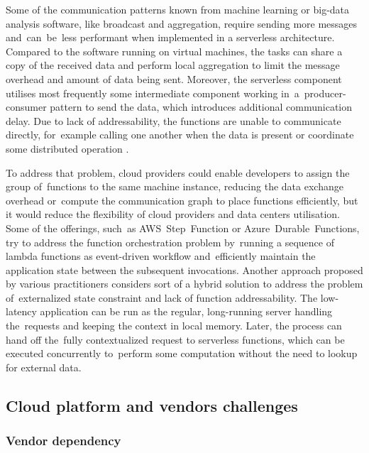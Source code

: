 Some of the communication patterns known from machine learning or big-data analysis software, like broadcast and aggregation, require sending more messages and~can~be~less performant when implemented in a serverless architecture. Compared to the software running on virtual machines, the tasks can share a copy of the received data and perform local aggregation to limit the message overhead and amount of data being sent. Moreover, the serverless component utilises most frequently some intermediate component working in~a~producer-consumer pattern to send the data, which introduces additional communication delay. Due to lack of addressability, the functions are unable to communicate directly, for~example calling one another when the data is present or coordinate some distributed operation \cite{BerkeleyServerless}.

To address that problem, cloud providers could enable developers to assign the group of~functions to the same machine instance, reducing the data exchange overhead or~compute the communication graph to place functions efficiently, but it would reduce the flexibility of cloud providers and data centers utilisation. Some of the offerings, such~as AWS~Step~Function or Azure~Durable~Functions, try to address the function orchestration problem by~running a sequence of lambda functions as event-driven workflow and~efficiently maintain the application state between the subsequent invocations.
Another approach proposed by various practitioners considers sort of a hybrid solution to address the problem of~externalized state constraint and lack of function addressability. The low-latency application can be run as the regular, long-running server handling the~requests and keeping the context in local memory. Later, the process can hand off the~fully contextualized request to serverless functions, which can be executed concurrently to~perform some computation without the need to lookup for external data.

\subsection{Cloud platform and vendors challenges} \label{chapter:serverless-cloud-platform-and-vendor-challenges}

\subsubsection{Vendor dependency} \label{chapter:serverless-vendor-dependence}

